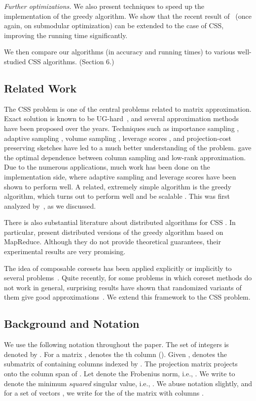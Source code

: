 \documentclass{article}
\begin{document}
{\em Further optimizations.} We also present techniques to speed up the implementation of the greedy algorithm. We show that the recent result of~\cite{Mirzasoleiman} (once again, on submodular optimization) can be extended to the case of CSS, improving the running time significantly.


We then compare our algorithms (in accuracy and running times) to various well-studied CSS algorithms. (Section 6.)

\subsection{Related Work}
The CSS problem is one of the central problems related to matrix approximation. Exact solution is known to be UG-hard~\cite{Civril2}, and several approximation methods have been proposed over the years. Techniques such as importance sampling \cite{Drineas1, Frieze}, adaptive sampling \cite{Deshpande1}, volume sampling \cite{Deshpande2, Deshpande4}, leverage scores \cite{Drineas-Leverage}, and projection-cost preserving sketches \cite{Cohen} have led to a much better understanding of the problem. \cite{Guruswami} gave the optimal dependence between column sampling and low-rank approximation.
Due to the numerous applications, much work has been done on the implementation side, where adaptive sampling and leverage scores have been shown to perform well. A related, extremely simple algorithm is the greedy algorithm, which turns out to perform well and be scalable \cite{Farahat1, Farahat2}. This was first analyzed by~\cite{Civril1}, as we discussed. 

There is also substantial literature about distributed algorithms for CSS \cite{Pi, Feldman, Cohen, Farahat3, Farahat4, Boutsidis2015}. In particular, \cite{Farahat3, Farahat4} present distributed versions of the greedy algorithm based on MapReduce. Although they do not provide theoretical guarantees, their experimental results are very promising.

The idea of composable coresets has been applied explicitly or implicitly to several problems~\cite{FeldmanSS13,BalcanEL13,VahabPODS2014}. Quite recently, for some problems in which coreset methods do not work in general, surprising results have shown that randomized variants of them give good approximations~\cite{BarbosaENW15,Mirrokni}. We extend this framework to the CSS problem.


\subsection{Background and Notation}
We use the following notation throughout the paper. The set of integers  is denoted by . For a matrix ,  denotes the th column (). Given ,  denotes the submatrix of  containing columns indexed by . The projection matrix  projects onto the column span of . Let  denote the Frobenius norm, i.e., . We write  to denote the minimum \textit{squared} singular value, i.e., . We abuse notation slightly, and for a set of vectors , we write  for the  of the matrix with columns .
\end{document}
